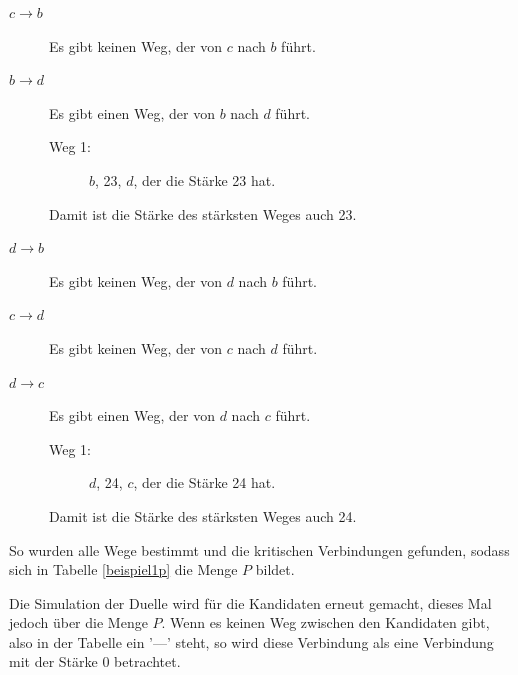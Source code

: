 \begin{description}
\item[$c \to b$] Es gibt keinen Weg, der von $c$ nach $b$ führt.

\item[$b \to d$] Es gibt einen Weg, der von $b$ nach $d$ führt.
	\begin{description}
	\item[Weg 1:] $b$, 23, $d$, der die Stärke 23 hat.
	\end{description}
	Damit ist die Stärke des stärksten Weges auch 23.
	
\item[$d \to b$] Es gibt keinen Weg, der von $d$ nach $b$ führt.

\item[$c \to d$] Es gibt keinen Weg, der von $c$ nach $d$ führt.
	
\item[$d \to c$] Es gibt einen Weg, der von $d$ nach $c$ führt.
	\begin{description}
	\item[Weg 1:] $d$, 24, $c$, der die Stärke 24 hat.
	\end{description}
	Damit ist die Stärke des stärksten Weges auch 24.	
\end{description}

So wurden alle Wege bestimmt und die kritischen Verbindungen gefunden, sodass sich in Tabelle \ref{beispiel1p} die Menge $P$ bildet.



Die Simulation der Duelle wird für die Kandidaten erneut gemacht, dieses Mal jedoch über die Menge $P$. Wenn es keinen Weg zwischen den Kandidaten gibt, also in der Tabelle ein '---' steht, so wird diese Verbindung als eine Verbindung mit der Stärke 0 betrachtet.

